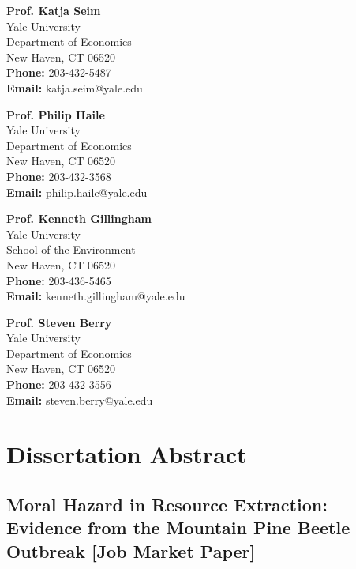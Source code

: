 \documentclass[11pt,letterpaper]{article}
\begin{document}
\begin{minipage}[t]{0.48\textwidth}
\textbf{Prof. Katja Seim} \\
Yale University \\
Department of Economics \\
New Haven, CT 06520 \\
\textbf{Phone:} 203-432-5487 \\
\textbf{Email:} katja.seim@yale.edu
\end{minipage}
\hfill
\begin{minipage}[t]{0.48\textwidth}
\textbf{Prof. Philip Haile} \\
Yale University \\
Department of Economics \\
New Haven, CT 06520 \\
\textbf{Phone:} 203-432-3568 \\
\textbf{Email:} philip.haile@yale.edu
\end{minipage}

\vspace{12pt}

\begin{minipage}[t]{0.48\textwidth}
\textbf{Prof. Kenneth Gillingham} \\
Yale University \\
School of the Environment \\
New Haven, CT 06520 \\
\textbf{Phone:} 203-436-5465 \\
\textbf{Email:} kenneth.gillingham@yale.edu
\end{minipage}
\hfill
\begin{minipage}[t]{0.48\textwidth}
\textbf{Prof. Steven Berry} \\
Yale University \\
Department of Economics \\
New Haven, CT 06520 \\
\textbf{Phone:} 203-432-3556 \\
\textbf{Email:} steven.berry@yale.edu
\end{minipage}

\newpage

\section*{Dissertation Abstract}

\subsection*{Moral Hazard in Resource Extraction: Evidence from the Mountain Pine Beetle Outbreak [Job Market Paper]}
\end{document}
